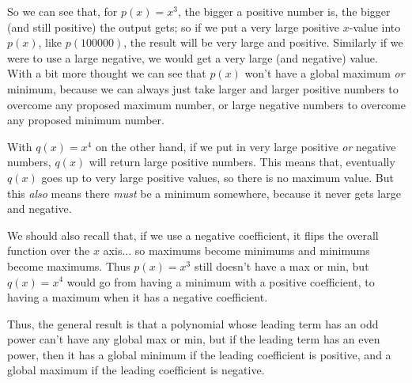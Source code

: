 \documentclass{ximeraXloud}
\begin{document}
    So we can see that, for $p(x) = x^3$, the bigger a positive number is, the bigger (and still positive) the output gets; so if we put a very large positive $x$-value into $p(x)$, like $p(100000)$, the result will be very large and positive. Similarly if we were to use a large negative, we would get a very large (and negative) value. With a bit more thought we can see that $p(x)$ won't have a global maximum \textit{or} minimum, because we can always just take larger and larger positive numbers to overcome any proposed maximum number, or large negative numbers to overcome any proposed minimum number.
    
    With $q(x) = x^4$ on the other hand, if we put in very large positive \textit{or} negative numbers, $q(x)$ will return large positive numbers. This means that, eventually $q(x)$ goes up to very large positive values, so there is no maximum value. But this \textit{also} means there \textit{must} be a minimum somewhere, because it never gets large and negative.
    
    We should also recall that, if we use a negative coefficient, it flips the overall function over the $x$ axis... so maximums become minimums and minimums become maximums. Thus $p(x) = x^3$ still doesn't have a max or min, but $q(x) = x^4$ would go from having a minimum with a positive coefficient, to having a maximum when it has a negative coefficient.
    
    Thus, the general result is that a polynomial whose leading term has an odd power can't have any global max or min, but if the leading term has an even power, then it has a global minimum if the leading coefficient is positive, and a global maximum if the leading coefficient is negative.


%
\end{document}

